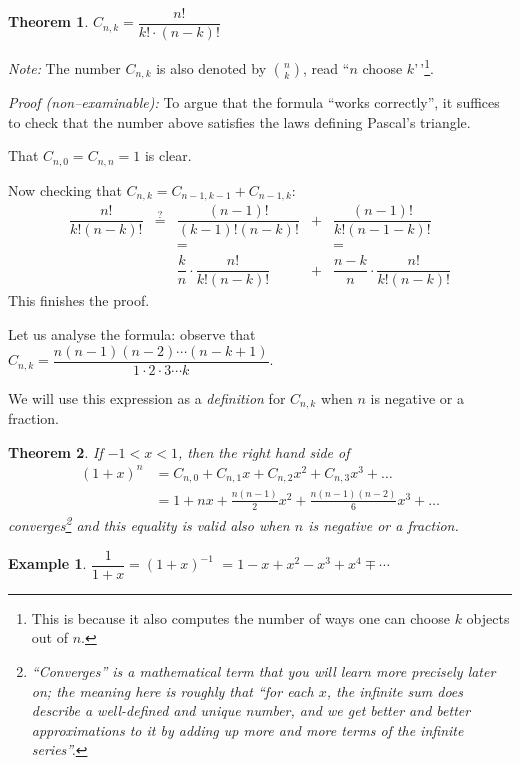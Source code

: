 \documentclass[
  12pt,
  oneside]{book}
\newtheorem{theorem}{Theorem}[chapter]
\theoremstyle{definition}
\theoremstyle{definition}
\newtheorem{example}{Example}[chapter]
\theoremstyle{definition}
\theoremstyle{definition}
\theoremstyle{remark}
\begin{document}
\begin{theorem}
\(\boxed{C_{n,k} = \dfrac{n!}{k!\cdot (n-k)!}}\)
\end{theorem}

\emph{Note:} The number \(C_{n,k}\) is also denoted by \(\displaystyle{n\choose k}\), read ``\(n\) choose \(k\)'\,'\footnote{This is because it also computes the number of ways one can choose \(k\) objects out of \(n\).}.

\emph{Proof (non--examinable):} To argue that the formula ``works correctly'', it suffices to check that the number above satisfies the laws defining Pascal's triangle.

That \(C_{n,0}=C_{n,n}=1\) is clear.

Now checking that \(C_{n,k}=C_{n-1,k-1}+C_{n-1,k}\):
\[
\begin{matrix}
    \dfrac{n!}{k!(n-k)!} &\stackrel{?}{=} & \dfrac{(n-1)!}{(k-1)!(n-k)!} & + & \dfrac{(n-1)!}{k!(n-1-k)!}\\
                        & & = & & = \\
                        & & \dfrac{k}{n}\cdot\dfrac{n!}{k!(n-k)!} & + & \dfrac{n-k}{n}\cdot \dfrac{n!}{k!(n-k)!}
\end{matrix}
\]
This finishes the proof.

Let us analyse the formula: observe that \(C_{n,k} = \dfrac{n(n-1)(n-2)\cdots(n-k+1)}{1\cdot 2\cdot 3 \cdots k}\).

We will use this expression as a \emph{definition} for \(C_{n,k}\) when \(n\) is negative or a fraction.

\begin{theorem}
If \(-1<x<1\), then the right hand side of
\begin{align*}
    (1+x)^n &= C_{n,0}+C_{n,1}x+C_{n,2}x^2 + C_{n,3}x^3 + \dots\\
            &= 1+ nx + \frac{n(n-1)}{2}x^2 + \frac{n(n-1)(n-2)}{6} x^3 + \dots
\end{align*}
converges\footnote{``Converges'' is a mathematical term that you will learn more precisely later on; the meaning here is roughly that ``for each \(x\), the infinite sum \emph{does} describe a well-defined and unique number, and we get better and better approximations to it by adding up more and more terms of the infinite series''.} and this equality is valid also when \(n\) is negative or a fraction.
\end{theorem}

\begin{example}
\(\dfrac{1}{1+x} = (1+x)^{-1}\) \(=1-x+x^2-x^3+x^4 \mp\cdots\)
\end{example}
\end{document}
